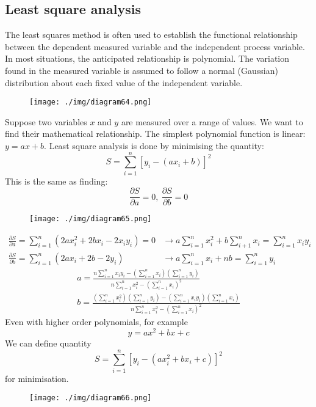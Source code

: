 \subsection{Least square analysis}
The least squares method is often used to establish the functional relationship between the dependent measured variable and the independent process variable. In most situations, the anticipated relationship is polynomial. The variation found in the measured variable is assumed to follow a normal (Gaussian) distribution about each fixed value of the independent variable.
\begin{figure}[H]
  \centering
  \texttt{[image: ./img/diagram64.png]}
\end{figure}
Suppose two variables $x$ and $y$ are measured over a range of values. We want to find their mathematical relationship. The simplest polynomial function is linear: $y = ax + b$. Least square analysis is done by minimising the quantity:
\begin{equation}
  S = \sum_{i = 1}^n [ y_i - (ax_i +b)]^2
\end{equation}
This is the same as finding:
\begin{equation}
  \frac{\partial S}{\partial a} = 0, \ \frac{\partial S}{\partial b} = 0
\end{equation}
\begin{figure}[H]
  \centering
  \texttt{[image: ./img/diagram65.png]}
\end{figure}
\begin{align}
  \frac{\partial S}{\partial a} = \sum_{i = 1}^n (2 ax_i^2 + 2bx_i - 2x_i y_i) = 0 & \rightarrow a\sum_{i=1}^n x_i^2 + b\sum_{i +1}^n x_i = \sum_{i=1}^n x_i y_i \\
  \frac{\partial S}{\partial b} = \sum_{i=1}^n (2ax_i + 2b - 2y_i)                 & \rightarrow a\sum_{i=1}^n x_i + nb = \sum_{i=1}^n y_i
\end{align}
\begin{gather}
  a = \frac{n \sum_{i=1}^n x_i y_i - \left(\sum_{i=1}^n x_i\right)\left(\sum_{i=1}^n y_i\right)}{n\sum_{i=1}^n x_i^2 - \left(\sum_{i=1}^n x_i\right)^2}\\
  b = \frac{\left(\sum_{i=1}^n x_i^2\right) \left(\sum_{i=1}^n y_i\right) - \left(\sum_{i=1}^n x_i y_i\right)\left(\sum_{i=1}^n x_i\right)}{n\sum_{i=1}^n x_i^2 - \left(\sum_{i=1}^n x_i\right)^2}
\end{gather}
Even with higher order polynomials, for example
\begin{equation}
  y = ax^2 + bx + c
\end{equation}
We can define quantity
\begin{equation}
  S = \sum_{i=1}^n [y_i - (ax_i^2 + bx_i +c)]^2
\end{equation}
for minimisation.
\begin{figure}[H]
  \centering
  \texttt{[image: ./img/diagram66.png]}
\end{figure}